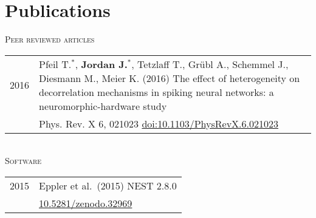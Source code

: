 \section{Publications}
\textsc{Peer reviewed articles}\\[.5em]
\begin{tabular}{>{\hfill}p{1.6cm} p{}}
  2016 & Pfeil T.$^*$, \textbf{Jordan J.}$^*$, Tetzlaff T., Gr\"ubl A., Schemmel J., Diesmann M., Meier K. (2016) The effect of heterogeneity on decorrelation mechanisms in spiking neural networks: a neuromorphic-hardware study \\
       & \footnotesize Phys. Rev. X 6, 021023 \href{http://dx.doi.org/10.1103/PhysRevX.6.021023}{doi:10.1103/PhysRevX.6.021023}
\end{tabular} \\[1em]
\textsc{Software}\\[.5em]
\begin{tabular}{>{\hfill}p{1.6cm} p{}}
  2015 & Eppler et al.~(2015) NEST 2.8.0 \\
       & \footnotesize \href{http://dx.doi.org/10.5281/zenodo.32969}{10.5281/zenodo.32969}
\end{tabular} \\[1em]


